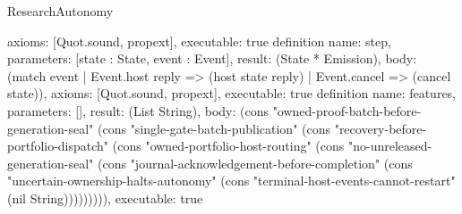 \begin{lexlean}{ResearchAutonomy}
\begin{semanticmodule}
{ axioms: [Quot.sound, propext],
 executable: true
}
definition{
 name: step,
 parameters: [state : State, event : Event],
 result: (State * Emission),
 body: (match event | Event.host reply => (host state reply) | Event.cancel => (cancel state)),
 axioms: [Quot.sound, propext],
 executable: true
}
definition{
 name: features,
 parameters: [],
 result: (List String),
 body: (cons "owned-proof-batch-before-generation-seal" (cons "single-gate-batch-publication" (cons "recovery-before-portfolio-dispatch" (cons "owned-portfolio-host-routing" (cons "no-unreleased-generation-seal" (cons "journal-acknowledgement-before-completion" (cons "uncertain-ownership-halts-autonomy" (cons "terminal-host-events-cannot-restart" (nil String))))))))),
 executable: true
}
\end{semanticmodule}
\end{lexlean}

